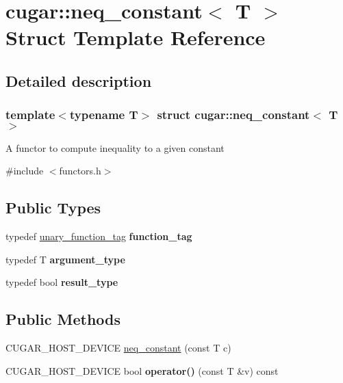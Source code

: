 \hypertarget{structcugar_1_1neq__constant}{}\section{cugar\+:\+:neq\+\_\+constant$<$ T $>$ Struct Template Reference}
\label{structcugar_1_1neq__constant}


\subsection{Detailed description}
\subsubsection*{template$<$typename T$>$\newline
struct cugar\+::neq\+\_\+constant$<$ T $>$}

A functor to compute inequality to a given constant 

{\ttfamily \#include $<$functors.\+h$>$}

\subsection*{Public Types}
\begin{DoxyCompactItemize}
\item 
\mbox{\label{structcugar_1_1neq__constant_a72b2f547c0273eb7f9dc6c5fb2b02a22}} 
typedef \hyperlink{structcugar_1_1unary__function__tag}{unary\+\_\+function\+\_\+tag} {\bfseries function\+\_\+tag}
\item 
\mbox{\label{structcugar_1_1neq__constant_a734f0bd1dacc38cd11346282fa39ef1b}} 
typedef T {\bfseries argument\+\_\+type}
\item 
\mbox{\label{structcugar_1_1neq__constant_a9343324a6a59a578b6baa2a40111853d}} 
typedef bool {\bfseries result\+\_\+type}
\end{DoxyCompactItemize}
\subsection*{Public Methods}
\begin{DoxyCompactItemize}
\item 
C\+U\+G\+A\+R\+\_\+\+H\+O\+S\+T\+\_\+\+D\+E\+V\+I\+CE \hyperlink{structcugar_1_1neq__constant_aedc7b9a2c797e8c34a66a37baefa50a1}{neq\+\_\+constant} (const T c)
\item 
\mbox{\label{structcugar_1_1neq__constant_afdafa7215aa5c71cdb18ce97d349a2f2}} 
C\+U\+G\+A\+R\+\_\+\+H\+O\+S\+T\+\_\+\+D\+E\+V\+I\+CE bool {\bfseries operator()} (const T \&v) const
\end{DoxyCompactItemize}


